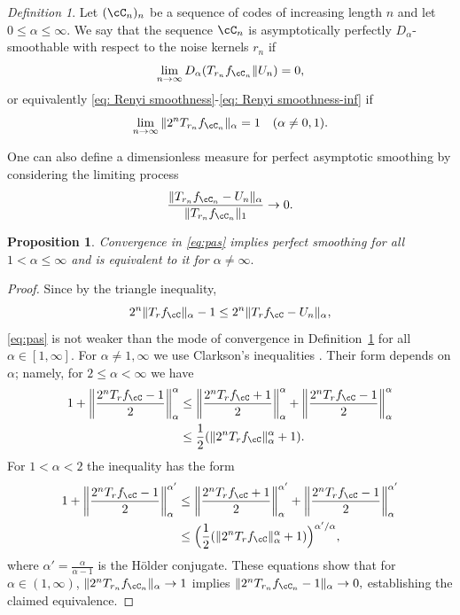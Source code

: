 \documentclass{amsart}
\newtheorem{proposition}[theorem]{Proposition}
\theoremstyle{remark}
\newtheorem{definition}{Definition}[section]
\begin{document}
\begin{definition}\label{def: asymptotic perfect uniformity-divergence }
Let $(\cC_n)_n$ be a sequence of codes of increasing length $n$ and let $0\le\alpha\le\infty.$
We say that the sequence $\cC_n$ is asymptotically perfectly $D_\alpha$-smoothable with respect to the noise kernels $r_n$  if  $$\lim_{n\to\infty}D_{\alpha}(T_{r_n}f_{\cC_n}\|U_n)= 0,$$ or equivalently \eqref{eq: Renyi smoothness}-\eqref{eq: Renyi smoothness-inf}
if $$\lim_{n\to\infty} \|2^nT_{r_n}f_{\cC_n}\|_{\alpha}= 1 \quad (\alpha\ne 0,1).$$
\end{definition}

One can also define a dimensionless measure for perfect asymptotic smoothing by considering the limiting process
    \begin{equation}\label{eq:pas}
\frac{\|T_{r_n}f_{\cC_n}-U_n\|_{\alpha} }{\|T_{r_n}f_{\cC_n}\|_1 } \rightarrow 0.
  \end{equation}

 \begin{proposition}\label{prop: pas equivalence} Convergence in \eqref{eq:pas} implies perfect smoothing for all $1<\alpha\le\infty$ 
and is equivalent to it for $\alpha\ne \infty.$
\end{proposition}
\begin{proof} 
Since by the triangle inequality, 
   $$
   2^n\|T_rf_\cC\|_\alpha -1 \leq 2^n\|T_rf_\cC-U_n\|_{\alpha} ,
   $$
\eqref{eq:pas} is not weaker than the mode of convergence in
Definition~\ref{def: asymptotic perfect uniformity-divergence } for all $\alpha \in [1,\infty]$.
For $\alpha\ne 1,\infty$ we use Clarkson's inequalities \cite[p.~388]{Simon2015}. Their form
depends on $\alpha$; namely, for 
$2\le\alpha<\infty$ we have
\begin{align*}
    1 + \left\|\frac{2^nT_rf_\cC -1}{2}\right\|_{\alpha}^{\alpha}  &\leq \left\|\frac{2^nT_rf_\cC +1}{2}\right\|_{\alpha}^{\alpha} + \left\|\frac{2^nT_rf_\cC -1}{2}\right\|_{\alpha}^{\alpha}\\
    &\leq \frac{1}{2}(\|2^nT_rf_\cC\|_{\alpha}^{\alpha} + 1).
\end{align*}
For $1<\alpha<2$ the inequality has the form
\begin{align*}
    1 + \left\|\frac{2^nT_rf_\cC -1}{2}\right\|_{\alpha}^{\alpha'}  &\leq \left\|\frac{2^nT_rf_\cC +1}{2}\right\|_{\alpha}^{\alpha'} + \left\|\frac{2^nT_rf_\cC -1}{2}\right\|_{\alpha}^{\alpha'} \\
    &\leq \Big(\frac{1}{2}(\|2^nT_rf_\cC\|_{\alpha}^{\alpha} + 1)\Big)^{\alpha'/\alpha},
\end{align*}
where $\alpha' = \frac{\alpha}{\alpha-1}$ is the H{\"o}lder conjugate. These equations show that for $\alpha \in (1,\infty)$, $ \|2^nT_{r_n}f_{\cC_n}\|_{\alpha} \to 1$ implies $\|2^nT_{r_n}f_{\cC_n}-1\|_{\alpha} \to 0,$ establishing the claimed equivalence.
\end{proof}
\end{document}
